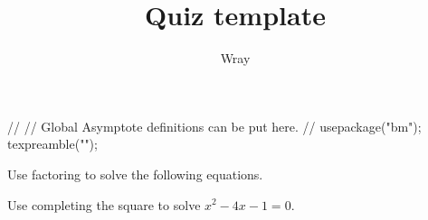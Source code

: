 \documentclass[addpoints, 12pt]{exam}
\title{Quiz template}
\author{Wray}
\begin{document}
\begin{asydef}
//
// Global Asymptote definitions can be put here.
//
usepackage("bm");
texpreamble("\def\V#1{\bm{#1}}");
\end{asydef}



\bigskip

             
\bigskip
\bigskip

\smallskip

\begin{questions}

\question
Use factoring to solve the following equations.
\newpage 

\question[8]
Use completing the square to solve $x^2 - 4x - 1 = 0$.


\end{questions}
\end{document}
